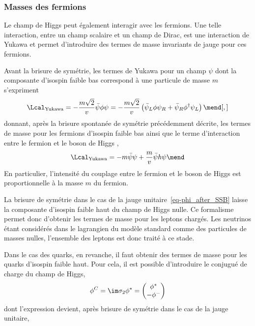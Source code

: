 \subsubsection{Masses des fermions}\label{chapter-MS-MSSM-section-formalisme-subsec-Higgs_mechanism-subsubsec-fermions}
Le champ de Higgs peut également interagir avec les fermions. Une telle interaction, entre un champ scalaire et un champ de Dirac, est une interaction de Yukawa et permet d'introduire des termes de masse invariants de jauge pour ces fermions.
\par Avant la brisure de symétrie, les termes de Yukawa pour un champ $\psi$ dont la composante d'isospin faible bas correspond à une particule de masse $m$ s'expriment
\begin{equation}
\Lcal_\text{Yukawa}
= - \frac{m\sqrt{2}}{v} \bar{\psi} \phi \psi
= - \frac{m\sqrt{2}}{v} \left( \bar{\psi}_L \phi \psi_R + \bar{\psi}_R \phi^\dagger \psi_L \right)
\mend[,]
\end{equation}
donnant, après la brisure spontanée de symétrie précédemment décrite, les termes de masse pour les fermions d'isospin faible bas
ainsi que le terme d'interaction entre le fermion et le boson de Higgs \higgs,
\begin{equation}
\Lcal_\text{Yukawa} = - m \bar{\psi}\psi + \frac{m}{v} \bar{\psi} h \psi
\mend
\end{equation}
En particulier, l'intensité du couplage entre le fermion et le boson de Higgs est proportionnelle à la masse $m$ du fermion.
\par
La brisure de symétrie dans le cas de la jauge unitaire~\eqref{eq-phi_after_SSB} laisse la composante d'isospin faible haut du champ de Higgs nulle.
Ce formalisme permet donc d'obtenir les termes de masse pour les leptons chargés. Les neutrinos étant considérés dans le lagrangien du modèle standard comme des particules de masses nulles, l'ensemble des leptons est donc traité à ce stade.
\par Dans le cas des quarks, en revanche, il faut obtenir des termes de masse pour les quarks d'isospin faible haut. Pour cela, il est possible d'introduire le conjugué de charge du champ de Higgs,
\begin{equation}
\phi^C = \im \sigma_2 \phi^* = \begin{pmatrix}
\phi^* \\ - \phi^-
\end{pmatrix}
\end{equation}
dont l'expression devient, après brisure de symétrie dans le cas de la jauge unitaire,

